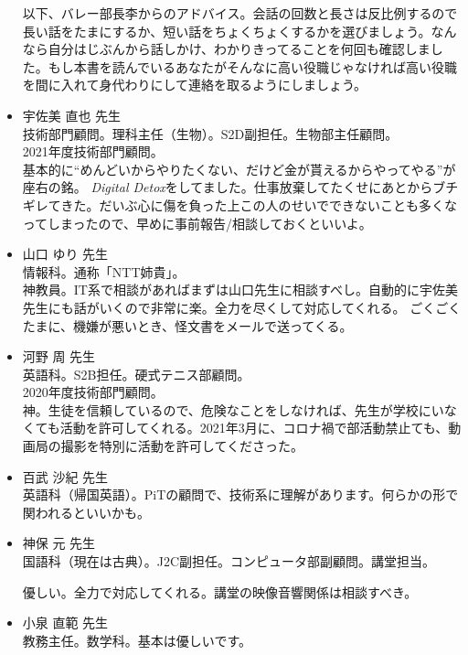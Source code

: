 \documentclass[dvipdfmx,jb5]{jreport}
\begin{document}
\begin{itemize}
            以下、バレー部長李からのアドバイス。会話の回数と長さは反比例するので長い話をたまにするか、短い話をちょくちょくするかを選びましょう。なんなら自分はじぶんから話しかけ、わかりきってることを何回も確認しました。もし本書を読んでいるあなたがそんなに高い役職じゃなければ高い役職を間に入れて身代わりにして連絡を取るようにしましょう。

      \item 宇佐美 直也 先生\\
            技術部門顧問。理科主任（生物）。S2D副担任。生物部主任顧問。\\
            2021年度技術部門顧問。\\
            基本的に``めんどいからやりたくない、だけど金が貰えるからやってやる''が座右の銘。
            \textit{Digital Detox}をしてました。仕事放棄してたくせにあとからブチギレてきた。だいぶ心に傷を負った上この人のせいでできないことも多くなってしまったので、早めに事前報告/相談しておくといいよ。
      \item 山口 ゆり 先生\\
            情報科。通称「NTT姉貴」。\\
            神教員。IT系で相談があればまずは山口先生に相談すべし。自動的に宇佐美先生にも話がいくので非常に楽。全力を尽くして対応してくれる。
            ごくごくたまに、機嫌が悪いとき、怪文書をメールで送ってくる。

      \item 河野 周 先生\\
            英語科。S2B担任。硬式テニス部顧問。\\
            2020年度技術部門顧問。\\
            神。生徒を信頼しているので、危険なことをしなければ、先生が学校にいなくても活動を許可してくれる。2021年3月に、コロナ禍で部活動禁止ても、動画局の撮影を特別に活動を許可してくださった。

      \item 百武 沙紀 先生\\
            英語科（帰国英語）。PiTの顧問で、技術系に理解があります。何らかの形で関われるといいかも。

      \item 神保 元 先生\\
            国語科（現在は古典）。J2C副担任。コンピュータ部副顧問。講堂担当。

            優しい。全力で対応してくれる。講堂の映像音響関係は相談すべき。

      \item 小泉 直範 先生\\
            教務主任。数学科。基本は優しいです。


\end{itemize}
\end{document}
